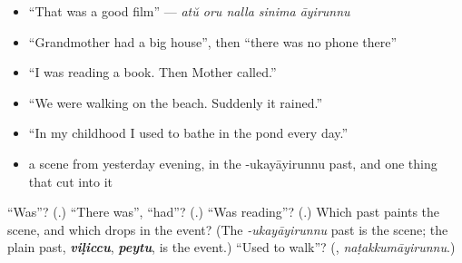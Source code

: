 \begin{itemize}
\raggedright
  \item \textquotedblleft{}That was a good film\textquotedblright{} — \emph{atŭ oru nalla sinima āyirunnu}
  \item \textquotedblleft{}Grandmother had a big house\textquotedblright{}, then \textquotedblleft{}there was no phone there\textquotedblright{}
  \item \textquotedblleft{}I was reading a book. Then Mother called.\textquotedblright{}
  \item \textquotedblleft{}We were walking on the beach. Suddenly it rained.\textquotedblright{}
  \item \textquotedblleft{}In my childhood I used to bathe in the pond every day.\textquotedblright{}
  \item a scene from yesterday evening, in the -ukayāyirunnu past, and one thing that cut into it
\end{itemize}

\begin{tcolorbox}[breakable,colback=teal!4,colframe=teal!35!black,title={Before you move on}]
\textquotedblleft{}Was\textquotedblright{}? (\textbf{}.) \textquotedblleft{}There was\textquotedblright{}, \textquotedblleft{}had\textquotedblright{}? (\textbf{}.) \textquotedblleft{}Was reading\textquotedblright{}? (\textbf{}.) Which past paints the scene, and which drops in the event? (The \emph{-ukayāyirunnu} past is the scene; the plain past, \emph{\textbf{viḷiccu}}, \emph{\textbf{peytu}}, is the event.) \textquotedblleft{}Used to walk\textquotedblright{}? (\textbf{}, \emph{naṭakkumāyirunnu}.)
\end{tcolorbox}
